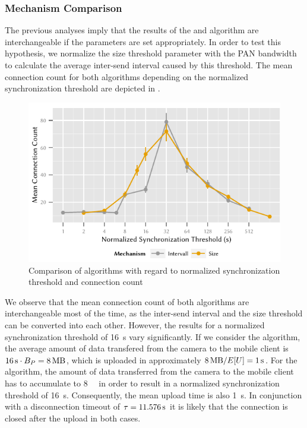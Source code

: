 \subsubsection*{Mechanism Comparison}\label{sec:application:cloud_file_synchronisation:numerical_evaluation:mechanism_comparison}
The previous analyses imply that the results of the \algointerval and \algosize algorithm are interchangeable if the parameters are set appropriately.
In order to test this hypothesis, we normalize the size threshold parameter with the \gls{PAN} bandwidth to calculate the average inter-send interval caused by this threshold.
The mean connection count for both algorithms depending on the normalized synchronization threshold are depicted in . 
\begin{figure}
  \includegraphics{application/cloud_file_synchronization/numerical_evaluation/figures/comparison}
  \caption{Comparison of algorithms with regard to normalized synchronization threshold and connection count}
  \label{fig:application:cloud_file_synchronisation:numerical_evaluation:mechanism_comparison:comparison}
\end{figure}

We observe that the mean connection count of both algorithms are interchangeable most of the time, as the inter-send interval and the size threshold can be converted into each other.
However, the results for a normalized synchronization threshold of \SI{16}{\second} vary significantly.
If we consider the \algointerval algorithm, the average amount of data transfered from the camera to the mobile client is \(\SI{16}{\second} \cdot \panTransferRate=\SI{8}{\mega\byte}\), which is uploaded in approximately \(\SI{8}{\mega\byte} / E[U] = \SI{1}{\second}\).
For the \algosize algorithm, the amount of data transferred from the camera to the mobile client has to accumulate to \SI{8}{\mega\byte} in order to result in a normalized synchronization threshold of \SI{16}{\second}.
Consequently, the mean upload time is also \SI{1}{\second}.
In conjunction with a disconnection timeout of \(\tau = \SI{11.576}{\second}\) it is likely that the connection is closed after the upload in both cases.

